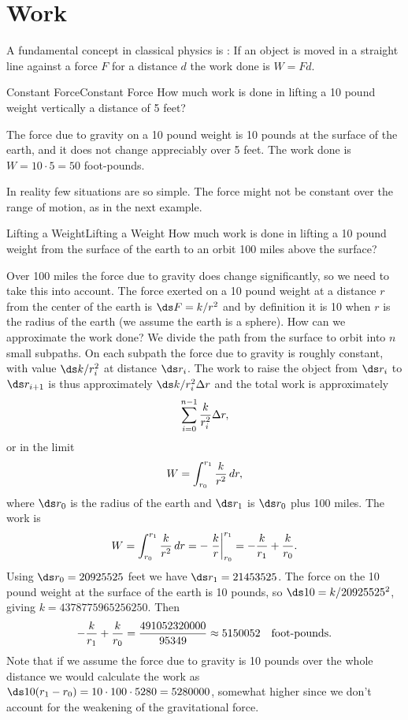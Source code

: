 \section{Work}{}{}\label{sec:Work}
A fundamental concept in classical physics is 
: If an object is moved in a straight line against
a force $F$ for a distance $d$ the work done is $W=Fd$.

\begin{example}{Constant Force}{Constant Force}\label{Constant Force}
How much work is done in lifting a 10 pound weight vertically a
distance of 5 feet? 
\end{example}

\begin{solution}
The force due to gravity on a 10 pound weight is
10 pounds at the surface of the earth, and it does not change
appreciably over 5 feet. The work done is $W=10\cdot 5=50$ foot-pounds.
\end{solution}

In reality few situations are so simple. The force might not be
constant over the range of motion, as in the next example.

\begin{example}{Lifting a Weight}{Lifting a Weight}\label{Lifting a Weight} 
How much work is done in lifting a 10 pound weight from the
surface of the earth to an orbit 100 miles above the surface? 
\end{example}

\begin{solution}
Over 100 miles the force due to gravity does change significantly, so we need
to take this into account. The force exerted on a 10 pound weight at a
distance $r$ from the center of the earth is $\ds F=k/r^2$ and by
definition it is 10 when $r$ is the radius of the earth (we assume the
earth is a sphere). How can we approximate the work done? We divide
the path from the surface to orbit into $n$ small subpaths. On each
subpath the force due to gravity is roughly constant, with value
$\ds k/r_i^2$ at distance $\ds r_i$. The work to raise the object from
$\ds r_i$ to $\ds r_{i+1}$ is thus approximately $\ds k/r_i^2\Delta r$ and the
total work is approximately
$$\sum_{i=0}^{n-1} {k\over r_i^2}\Delta r,$$
or in the limit
$$W=\int_{r_0}^{r_1} {k\over r^2}\,dr,$$
where $\ds r_0$ is the radius of the earth and $\ds r_1$ is $\ds r_0$ plus 100
miles. The work is
$$W=\int_{r_0}^{r_1} {k\over r^2}\,dr=
-\left.{k\over r}\right|_{r_0}^{r_1}=-{k\over r_1}+{k\over r_0}.$$
Using $\ds r_0=20925525$ feet we have $\ds r_1=21453525$. The force on the 10
pound weight at the surface of the earth is 10 pounds, so 
$\ds 10=k/20925525^2$, giving $k=4378775965256250$. Then
$$-{k\over r_1}+{k\over r_0}={491052320000\over 95349}\approx 5150052
\quad\hbox{foot-pounds}.$$
Note that if we assume the force due to gravity is 10 pounds over the
whole distance we would calculate the work as $\ds 10(r_1-r_0)=10\cdot100\cdot
5280=5280000$, somewhat higher since we don't account for the
weakening of the gravitational force.
\end{solution}


